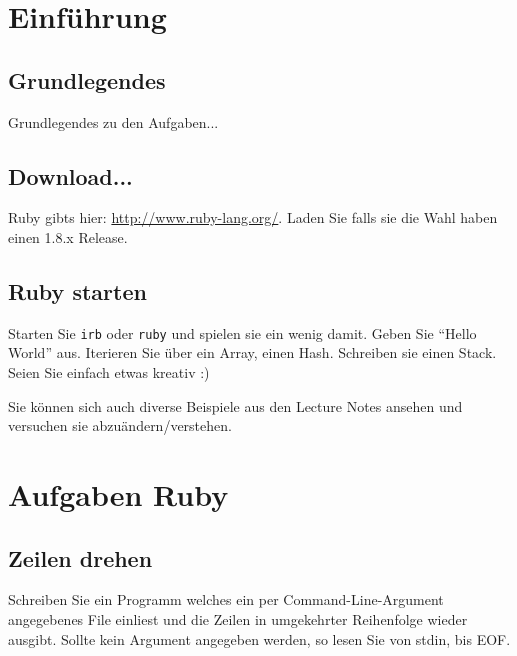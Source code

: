 \documentclass[a4paper,11pt,oneside]{scrbook}
\begin{document}
\renewcommand{\theequation}{\thesection.\arabic}
\setcapindent*{1em}


\chapter{Einführung} %
\label{cha:einführung}

\section{Grundlegendes} %
\label{sec:Grundlegendes}
Grundlegendes zu den Aufgaben...



\section{Download...} %
\label{sec:download_}
Ruby gibts hier: \url{http://www.ruby-lang.org/}. Laden Sie falls sie die Wahl haben einen 1.8.x Release.

\section{Ruby starten} %
\label{sec:ruby_starten}
Starten Sie \texttt{irb} oder \texttt{ruby} und spielen sie ein wenig damit. Geben Sie “Hello World” aus. Iterieren Sie über ein Array, einen Hash. Schreiben sie einen Stack. Seien Sie einfach etwas kreativ :)

Sie können sich auch diverse Beispiele aus den Lecture Notes ansehen und versuchen sie abzuändern/verstehen.








\chapter{Aufgaben Ruby} %
\label{cha:Aufgaben Ruby}



\section{Zeilen drehen} %
\label{sec:Zeilen drehen}
Schreiben Sie ein Programm welches ein per Command-Line-Argument angegebenes File einliest und die Zeilen in umgekehrter Reihenfolge wieder ausgibt.
Sollte kein Argument angegeben werden, so lesen Sie von stdin, bis EOF.
\end{document}
